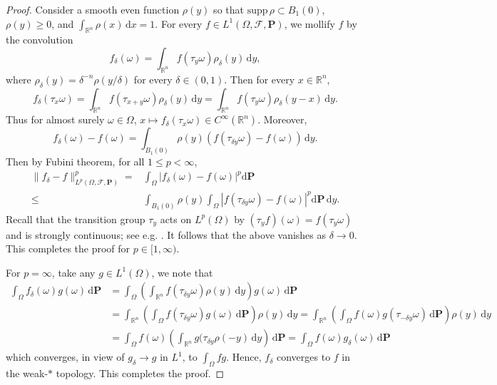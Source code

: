 \documentclass[11pt,reqno]{amsart}
\theoremstyle{definition}
\theoremstyle{remark}
\numberwithin{equation}{section}
\newcommand{\R}{{\mathbb{R}}}
\newcommand{\dd}{\mathrm{d}}
\begin{document}
\begin{proof}
Consider a smooth even function $\rho(y)$ so that $\text{supp}\,\rho \subset B_{1}(0)$, $\rho(y) \geq 0$, and $ \int_{\mathbb{R}^n} \rho (x)\,\mathrm{d}x =1$. For every $f \in L^{1}(\Omega,\mathscr{F},\mathbf{P})$, we mollify $f$ by the convolution 
\begin{equation}
\label{eq:rvmolify}
    f_{\delta}(\omega)= \int_{\mathbb{R}^n} f(\tau_{y}\omega)\rho_{\delta}(y)\,\mathrm{d}y, 
\end{equation}
where $\rho_{\delta}(y) = \delta^{-n}\rho(y/\delta)$ for every $\delta \in (0,1)$. Then for every $x \in \mathbb{R}^n$,
\begin{equation*}
    f_{\delta}(\tau_{x}\omega)= \int_{\mathbb{R}^n} f(\tau_{x+y}\omega)\rho_{\delta}(y)\,\mathrm{d}y = \int_{\mathbb{R}^n} f(\tau_{y}\omega)\rho_{\delta}(y-x)\,\mathrm{d}y.
\end{equation*}
Thus for almost surely $\omega \in \Omega$, $x \mapsto f_{\delta}(\tau_{x}\omega) \in C^{\infty}(\mathbb{R}^n)$. Moreover,
\begin{equation*}
    f_{\delta}(\omega) - f(\omega) = \int_{B_{1}(0)} \rho(y)(f(\tau_{\delta y}\omega) - f(\omega))\,\mathrm{d}y.
\end{equation*}
Then by Fubini theorem, for all $ 1 \leq p < \infty$,
\begin{align*}
    \|f_{\delta} - f\|^{p}_{L^{p}(\Omega,\mathscr{F},\mathbf{P})} = & \int_{\Omega}|f_{\delta}(\omega) - f(\omega)|^{p}\mathrm{d}\mathbf{P} \\
    \leq & \int_{B_{1}(0)} \rho(y) \int_{\Omega} |f(\tau_{\delta y}\omega) - f(\omega)|^{p}\mathrm{d}\mathbf{P} \,\mathrm{d}y.%
\end{align*}
Recall that the transition group $\tau_{y}$ acts on $L^p(\Omega)$ by $(\tau_y f)(\omega) = f(\tau_y \omega)$ and is strongly continuous; see e.g. \cite[section 7.1]{JKO12}. It follows that the above vanishes as $\delta\to 0$. This completes the proof for $p\in [1,\infty)$.

For $p=\infty$, take any $g\in L^1(\Omega)$, we note that
\begin{equation*}
\begin{aligned}
\int_\Omega f_\delta(\omega) g(\omega)\,\dd \mathbf{P} &= \int_\Omega \left(\int_{\R^n} f(\tau_{\delta y}\omega) \rho(y)\,\dd y\right) g(\omega)\,\dd \mathbf{P} \\
&=  \int_{\R^n}\left(\int_\Omega f(\tau_{\delta y}\omega)  g(\omega)\,\dd \mathbf{P}\right) \rho(y)\,\dd y = \int_{\R^n}\left(\int_\Omega f(\omega)  g(\tau_{-\delta y}\omega)\,\dd \mathbf{P}\right) \rho(y)\,\dd y\\
&=\int_\Omega f(\omega)\left(\int_{\R^n} g(\tau_{\delta y} \rho(-y) \,\dd y\right) \,\dd \mathbf{P} = \int_\Omega f(\omega) g_\delta(\omega)\,\dd \mathbf{P}
\end{aligned}
\end{equation*}
which converges, in view of $g_\delta \to g$ in $L^1$, to $\int_\Omega fg$. Hence, $f_\delta$ converges to $f$ in the weak-$*$ topology. This completes the proof.
\end{proof}
\end{document}
